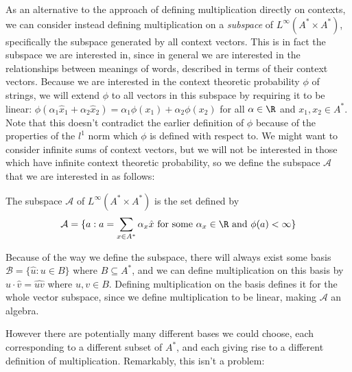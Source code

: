 As an alternative to the approach of defining multiplication directly on contexts, we can consider instead defining multiplication on a \emph{subspace} of $L^\infty(A^*\times A^*)$, specifically the subspace generated by all context vectors. This is in fact the subspace we are interested in, since in general we are interested in the relationships between meanings of words, described in terms of their context vectors. Because we are interested in the context theoretic probability $\phi$ of strings, we will extend $\phi$ to all vectors in this subspace by requiring it to be linear: $\phi(\alpha_1 \hat{x}_1 + \alpha_2\hat{x}_2) = \alpha_1\phi(x_1) + \alpha_2\phi(x_2)$ for all $\alpha \in \R$ and $x_1, x_2 \in A^*$. Note that this doesn't contradict the earlier definition of $\phi$ because of the properties of the $l^1$ norm which $\phi$ is defined with respect to. We might want to consider infinite sums of context vectors, but we will not be interested in those which have infinite context theoretic probability, so we define the subspace $\mathcal{A}$ that we are interested in as follows:
\begin{defn}
The subspace $\mathcal{A}$ of $L^\infty(A^*\times A^*)$ is the set defined by
$$\mathcal{A} = \{a : a = \sum_{x\in A^*}\alpha_x \hat{x}\text{ for some }\alpha_x \in \R\text{ and }\phi(a) < \infty\}$$
\end{defn}


Because of the way we define the subspace, there will always exist some basis $\mathcal{B} = \{\hat{u} : u \in B\}$ where $B \subseteq A^*$, and we can define multiplication on this basis by $\hat{u}\cdot\hat{v} = \widehat{uv}$ where $u,v \in B$. Defining multiplication on the basis defines it for the whole vector subspace, since we define multiplication to be linear, making $\mathcal{A}$ an algebra.

However there are potentially many different bases we could choose, each corresponding to a different subset of $A^*$, and each giving rise to a different definition of multiplication. Remarkably, this isn't a problem:

